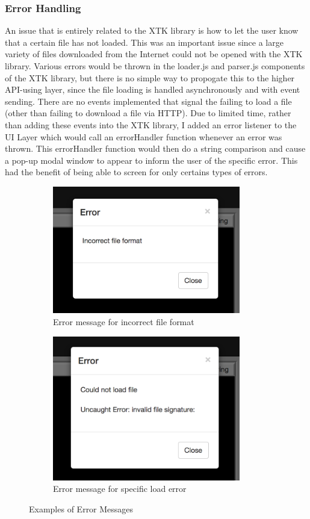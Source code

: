 \documentclass[a4paper,11pt,titlepage]{article}
\begin{document}
\subsubsection{Error Handling}
An issue that is entirely related to the XTK library is how to let the user know that a certain file has not loaded. This was an important issue since a large variety of files downloaded from the Internet could not be opened with the XTK library. Various errors would be thrown in the loader.js and parser.js components of the XTK library, but there is no simple way to propogate this to the higher API-using layer, since the file loading is handled asynchronously and with event sending. There are no events implemented that signal the failing to load a file (other than failing to download a file via HTTP). Due to limited time, rather than adding these events into the XTK library, I added an error listener to the UI Layer which would call an errorHandler function whenever an error was thrown. This errorHandler function would then do a string comparison and cause a pop-up modal window to appear to inform the user of the specific error. This had the benefit of being able to screen for only certains types of errors.


\begin{figure}
\centering
\begin{subfigure}{.5\textwidth}
  \centering
  \includegraphics[width=82mm]{graphics/error_01.png}
  \caption{Error message for incorrect file format}
\end{subfigure}%
\begin{subfigure}{.5\textwidth}
  \centering
  \includegraphics[width=82mm]{graphics/error_02.png}
  \caption{Error message for specific load error}
\end{subfigure}
\caption{Examples of Error Messages}

\end{figure}
\end{document}
